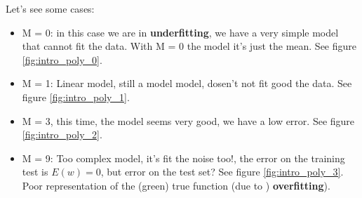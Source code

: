 \documentclass[../main.tex]{subfiles}
\begin{document}
Let's see some cases:
\begin{itemize}
    \item M = 0: in this case we are in \textbf{underfitting}, we have a very simple model that cannot fit the data. With M = 0 the model it's just the mean. See figure \ref{fig:intro_poly_0}.
    \item M = 1: Linear model,  still a model model, dosen't not fit good the data. See figure \ref{fig:intro_poly_1}.
    \item M = 3, this time, the model seems very good, we have a low error. See figure \ref{fig:intro_poly_2}.
    \item M = 9: Too complex model, it's fit the noise too!, the error on the training test is $E(w) = 0$, but error on the test set?  See figure \ref{fig:intro_poly_3}. Poor representation of the (green) true function (due to ) \textbf{overfitting}).
\end{itemize}
\end{document}
